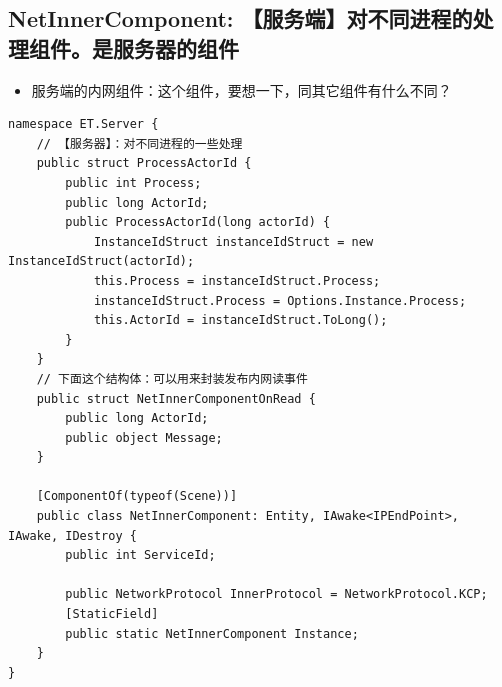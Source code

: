 \documentclass[9pt, b5paper]{article}
\begin{document}
\subsection{NetInnerComponent: 【服务端】对不同进程的处理组件。是服务器的组件}
\label{sec-8-8}
\begin{itemize}
\item 服务端的内网组件：这个组件，要想一下，同其它组件有什么不同？
\end{itemize}
\begin{verbatim}
namespace ET.Server {
    // 【服务器】：对不同进程的一些处理
    public struct ProcessActorId {
        public int Process;
        public long ActorId;
        public ProcessActorId(long actorId) {
            InstanceIdStruct instanceIdStruct = new InstanceIdStruct(actorId);
            this.Process = instanceIdStruct.Process;
            instanceIdStruct.Process = Options.Instance.Process;
            this.ActorId = instanceIdStruct.ToLong();
        }
    }
    // 下面这个结构体：可以用来封装发布内网读事件
    public struct NetInnerComponentOnRead {
        public long ActorId;
        public object Message;
    }
    
    [ComponentOf(typeof(Scene))]
    public class NetInnerComponent: Entity, IAwake<IPEndPoint>, IAwake, IDestroy {
        public int ServiceId;
        
        public NetworkProtocol InnerProtocol = NetworkProtocol.KCP;
        [StaticField]
        public static NetInnerComponent Instance;
    }
}
\end{verbatim}
\end{document}
